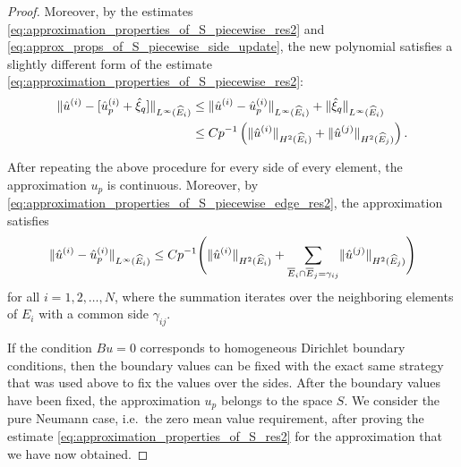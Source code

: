 \documentclass[english, 12pt, a4paper, sci, utf8, a-2b, online]{aaltothesis}
\theoremstyle{definition}
\theoremstyle{plain}
\DeclarePairedDelimiter\norm{\lVert}{\rVert}
\numberwithin{equation}{section}
\begin{document}
\begin{proof}
    Moreover, by the estimates \eqref{eq:approximation_properties_of_S_piecewise_res2}
    and \eqref{eq:approx_props_of_S_piecewise_side_update},
    the new polynomial satisfies a slightly different form of the estimate
    \eqref{eq:approximation_properties_of_S_piecewise_res2}:
    \begin{align}
        \norm{\hat{u}^{(i)} - [\hat{u}_p^{(i)} + \hat{\xi}_q]}_{L^{\infty}(\widehat{E}_i)}
        &\leq \norm{\hat{u}^{(i)} - \hat{u}_p^{(i)}}_{L^{\infty}(\widehat{E}_i)}
            + \norm{\hat{\xi}_q}_{L^{\infty}(\widehat{E}_i)} \nonumber \\
        \label{eq:approximation_properties_of_S_piecewise_edge_res2}
        &\leq C p^{-1} \left( \norm{\hat{u}^{(i)}}_{H^2(\widehat{E}_i)}
            + \norm{\hat{u}^{(j)}}_{H^2(\widehat{E}_j)} \right).
    \end{align}
    
    After repeating the above procedure for every side of every element,
    the approximation $u_p$ is continuous.
    Moreover, by \eqref{eq:approximation_properties_of_S_piecewise_edge_res2},
    the approximation satisfies
    \begin{equation}
        \label{eq:approx_prop_S_piecewise_side_final_est}
        \norm{\hat{u}^{(i)} - \hat{u}_p^{(i)}}_{L^{\infty}(\widehat{E}_i)}
        \leq C p^{-1} \Bigg( \norm{\hat{u}^{(i)}}_{H^2(\widehat{E}_i)} +
            \sum_{\overline{E}_i \cap \overline{E}_j = \gamma_{ij}}
            \norm{\hat{u}^{(j)}}_{H^2(\widehat{E}_j)} \Bigg)
    \end{equation}
    for all $i=1,2,\dotsc,N$, where the summation iterates over the neighboring elements of $E_i$
    with a common side $\gamma_{ij}$.

    If the condition $Bu = 0$ corresponds to homogeneous Dirichlet boundary conditions,
    then the boundary values can be fixed with the exact same strategy that was used
    above to fix the values over the sides. After the boundary values have been fixed,
    the approximation $u_p$ belongs to the space $S$.
    We consider the pure Neumann case,
    i.e.\ the zero mean value requirement, after proving the estimate
    \eqref{eq:approximation_properties_of_S_res2} for the approximation that we have now obtained.


\end{proof}
\end{document}
